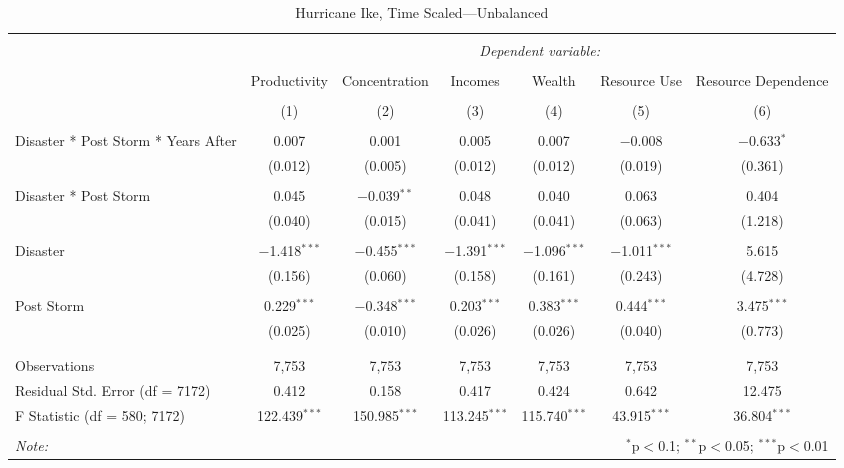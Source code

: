 
\begin{table}[!htbp] \centering 
  \caption{Hurricane Ike, Time Scaled---Unbalanced} 
  \label{} 
\footnotesize 
\begin{tabular}{@{\extracolsep{5pt}}lcccccc} 
\\[-1.8ex]\hline 
\hline \\[-1.8ex] 
 & \multicolumn{6}{c}{\textit{Dependent variable:}} \\ 
\cline{2-7} 
\\[-1.8ex] & Productivity & Concentration & Incomes & Wealth & Resource Use & Resource Dependence \\ 
\\[-1.8ex] & (1) & (2) & (3) & (4) & (5) & (6)\\ 
\hline \\[-1.8ex] 
 Disaster * Post Storm * Years After & 0.007 & 0.001 & 0.005 & 0.007 & $-$0.008 & $-$0.633$^{*}$ \\ 
  & (0.012) & (0.005) & (0.012) & (0.012) & (0.019) & (0.361) \\ 
  & & & & & & \\ 
 Disaster * Post Storm & 0.045 & $-$0.039$^{**}$ & 0.048 & 0.040 & 0.063 & 0.404 \\ 
  & (0.040) & (0.015) & (0.041) & (0.041) & (0.063) & (1.218) \\ 
  & & & & & & \\ 
 Disaster & $-$1.418$^{***}$ & $-$0.455$^{***}$ & $-$1.391$^{***}$ & $-$1.096$^{***}$ & $-$1.011$^{***}$ & 5.615 \\ 
  & (0.156) & (0.060) & (0.158) & (0.161) & (0.243) & (4.728) \\ 
  & & & & & & \\ 
 Post Storm & 0.229$^{***}$ & $-$0.348$^{***}$ & 0.203$^{***}$ & 0.383$^{***}$ & 0.444$^{***}$ & 3.475$^{***}$ \\ 
  & (0.025) & (0.010) & (0.026) & (0.026) & (0.040) & (0.773) \\ 
  & & & & & & \\ 
\hline \\[-1.8ex] 
Observations & 7,753 & 7,753 & 7,753 & 7,753 & 7,753 & 7,753 \\ 
Residual Std. Error (df = 7172) & 0.412 & 0.158 & 0.417 & 0.424 & 0.642 & 12.475 \\ 
F Statistic (df = 580; 7172) & 122.439$^{***}$ & 150.985$^{***}$ & 113.245$^{***}$ & 115.740$^{***}$ & 43.915$^{***}$ & 36.804$^{***}$ \\ 
\hline 
\hline \\[-1.8ex] 
\textit{Note:}  & \multicolumn{6}{r}{$^{*}$p$<$0.1; $^{**}$p$<$0.05; $^{***}$p$<$0.01} \\ 
\end{tabular} 
\end{table} 
